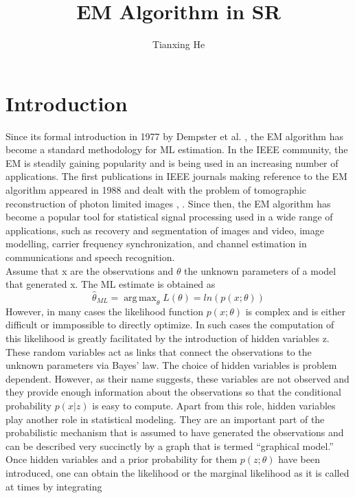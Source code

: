 \documentclass[11pt]{article}
\title{\textbf{EM Algorithm in SR}}
\author{Tianxing He}
\date{}
\DeclareMathOperator*{\argmax}{arg\,max}
\begin{document}

\maketitle

\section{Introduction}
Since its formal introduction in 1977 by Dempster et al. \cite{ADempsterEM}, the EM algorithm has become a standard methodology for ML estimation. In the IEEE community, the EM is steadily gaining popularity and is being used in an increasing number of applications. The first publications in IEEE journals making reference to the EM algorithm appeared in 1988 and dealt with the problem of tomographic reconstruction of photon limited images \cite{1977Posit}, \cite{1988Bayes}. Since then, the EM algorithm has become a popular tool for statistical signal processing used in a wide range of applications, such as recovery and segmentation of images and video, image modelling, carrier frequency synchronization, and channel estimation in communications and speech recognition. \\
Assume that x are the observations and $\theta$ the unknown parameters of a model that generated x. The ML estimate is obtained as 
\begin{equation}
\hat{\theta}_{ML}= \argmax_{\theta}L(\theta) = ln(p(x;\theta))
\end{equation}
However, in many cases the likelihood function $p(x;\theta)$ is complex and is either difficult or immpossible to directly optimize. In such cases the computation of this likelihood is greatly facilitated by the introduction of hidden variables z. These random variables act as links that connect the observations to the unknown parameters via Bayes’ law. The choice of hidden variables is problem dependent. However, as their name suggests, these variables are not observed and they provide enough information about the observations so that the conditional probability $p(x|z)$ is easy to compute. Apart from this role, hidden variables play
another role in statistical modeling. They are an important part of the probabilistic mechanism that is assumed to have generated the observations and can be described very succinctly by a graph that is termed “graphical model.” 
Once hidden variables and a prior probability for them $p(z;\theta)$ have been introduced, one can obtain the likelihood or the marginal likelihood as it is called at times by integrating
\end{document}
